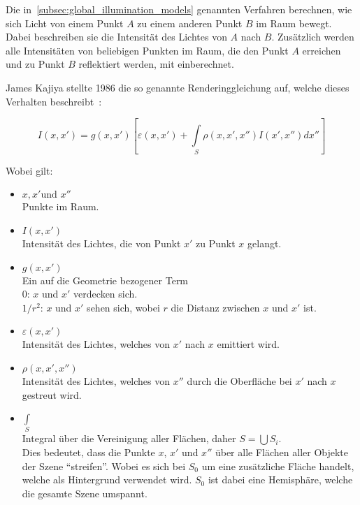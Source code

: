 Die in~\autoref{subsec:global_illumination_models} genannten Verfahren
berechnen, wie sich Licht von einem Punkt $A$ zu einem anderen Punkt $B$
im Raum bewegt. Dabei beschreiben sie die Intensität des Lichtes von $A$
nach $B$. Zusätzlich werden alle Intensitäten von beliebigen Punkten im
Raum, die den Punkt $A$ erreichen und zu Punkt $B$ reflektiert werden,
mit einberechnet.

James Kajiya stellte 1986 die so genannte Renderinggleichung auf, welche
dieses Verhalten
beschreibt~\parencites{kajiya_rendering_1986}{foley_computer_1996}:

\begin{equation}
    I(x, x') = g(x, x')[\varepsilon(x, x') + \int\limits_{S}\rho(x, x', x'')I(x', x'')dx'']
\end{equation}

Wobei gilt:

\begin{itemize}
    \item $x, x' \text{und } x''$\\
        Punkte im Raum.
    \item $ I(x, x')$\\
        Intensität des Lichtes, die von Punkt $x'$ zu Punkt $x$ gelangt.
    \item $ g(x, x')$\\
        Ein auf die Geometrie bezogener Term\\
        \hspace*{4mm} $0$:     \hspace*{6mm} $x$ und $x'$ verdecken
                               sich.\\
        \hspace*{4mm} $1/r^2$: \hspace*{1mm} $x$ und $x'$ sehen sich,
                               wobei $r$ die Distanz zwischen $x$ und
                               $x'$ ist.
    \item $\varepsilon(x, x')$\\
        Intensität des Lichtes, welches von $x'$ nach $x$ emittiert
        wird.
    \item $\rho(x, x', x'')$\\
        Intensität des Lichtes, welches von $x''$
        durch die Oberfläche bei $x'$ nach $x$
        gestreut wird.
    \item $\int\limits_{S}$\\
        Integral über die Vereinigung aller Flächen, daher $ S =
        \bigcup{S_{i}} $.\\ Dies bedeutet, dass die Punkte $x$, $x'$ und
        $x''$ über alle Flächen aller Objekte der Szene ``streifen''.
        Wobei es sich bei $S_{0}$ um eine zusätzliche Fläche handelt,
        welche als Hintergrund verwendet wird.  $S_{0}$ ist dabei eine
        Hemisphäre, welche die gesamte Szene umspannt.
\end{itemize}
